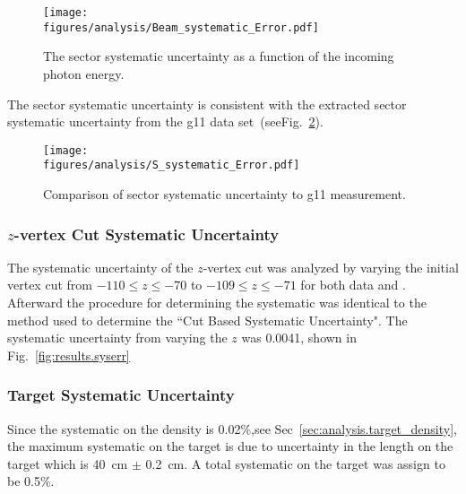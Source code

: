 \begin{figure}[h!]\begin{center}
\texttt{[image: \\figures/analysis/Beam\_systematic\_Error.pdf]}
\caption[The sector systematic uncertainty as a function of the incoming photon energy]{\label{fig:sys_sec_error}The sector systematic uncertainty as a function of the incoming photon energy.}
\end{center}\end{figure}
The sector systematic uncertainty is consistent with the extracted sector systematic uncertainty from the g11 data set~\cite{williams}(seeFig.~\ref{fig:sys_sec_error.compare}).
\begin{figure}[h!]\begin{center}
\texttt{[image: \\figures/analysis/S\_systematic\_Error.pdf]}
\caption[Comparison of sector systematic uncertainty to g11 measurement]{\label{fig:sys_sec_error.compare}Comparison of sector systematic uncertainty to g11 measurement.}
\end{center}\end{figure}
\FloatBarrier

\subsubsection{$z$-vertex Cut Systematic Uncertainty}
The systematic uncertainty of the $z$-vertex cut was analyzed by varying the initial vertex cut from $-110 \le z \le -70$ to $-109 \le z \le -71$ for both data and . Afterward the procedure for determining the systematic was identical to the method used to determine the ``Cut Based Systematic Uncertainty". The systematic uncertainty from varying the $z$ was 0.0041, shown in Fig.~\ref{fig:results.syserr}

\subsubsection{Target Systematic Uncertainty}
Since the systematic on the density is 0.02\%,see Sec~\ref{sec:analysis.target_density}, the maximum systematic on the target is due to uncertainty in the length on the target which is 40~cm $\pm$ 0.2~cm. A total systematic on the target was assign to be 0.5\%. 

